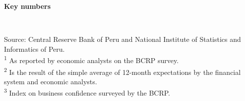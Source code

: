 \documentclass[final,a4paper]{report}
\begin{document}
\begin{vwcol}[widths={0.45,0.55},
 sep=.7cm, justify=flush,rule=0pt,indent=0em]
	\begin{minipage}{0.36\textwidth} \vspace{0cm}
		\hspace{0.2cm} \large \bfseries \textcolor{red1}{Key numbers} \normalcolor \small \normalfont
		\vspace{0.3cm}
		
		\noindent \footnotesize 
		\color{black!100}
		{\renewcommand{\arraystretch}{1.4}
			\hspace{0cm} \begin{tabular}[c]{p{4cm}ccc}
				 \\
%				
				\hline
			\end{tabular}
		}
		\\
		\color{blackdark} Source: Central Reserve Bank of Peru and National Institute of Statistics and Informatics of Peru. \\
		\color{blackdark} \textsuperscript{1} As reported by economic analysts on the BCRP survey. \\
		\color{blackdark} \textsuperscript{2} Is the result of the simple average of 12-month expectations by the financial system and economic analysts. \\
		\color{blackdark} \textsuperscript{3} Index on business confidence surveyed by the BCRP.


\end{minipage}
\end{vwcol}
\end{document}
